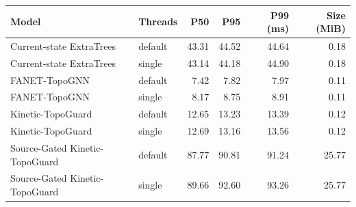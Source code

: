 \begin{tabular}{llrrrr}
\toprule
Model & Threads & P50 & P95 & P99 (ms) & Size (MiB) \\
\midrule
Current-state ExtraTrees & default & 43.31 & 44.52 & 44.64 & 0.18 \\
Current-state ExtraTrees & single & 43.14 & 44.18 & 44.90 & 0.18 \\
FANET-TopoGNN & default & 7.42 & 7.82 & 7.97 & 0.11 \\
FANET-TopoGNN & single & 8.17 & 8.75 & 8.91 & 0.11 \\
Kinetic-TopoGuard & default & 12.65 & 13.23 & 13.39 & 0.12 \\
Kinetic-TopoGuard & single & 12.69 & 13.16 & 13.56 & 0.12 \\
Source-Gated Kinetic-TopoGuard & default & 87.77 & 90.81 & 91.24 & 25.77 \\
Source-Gated Kinetic-TopoGuard & single & 89.66 & 92.60 & 93.26 & 25.77 \\
\bottomrule
\end{tabular}
